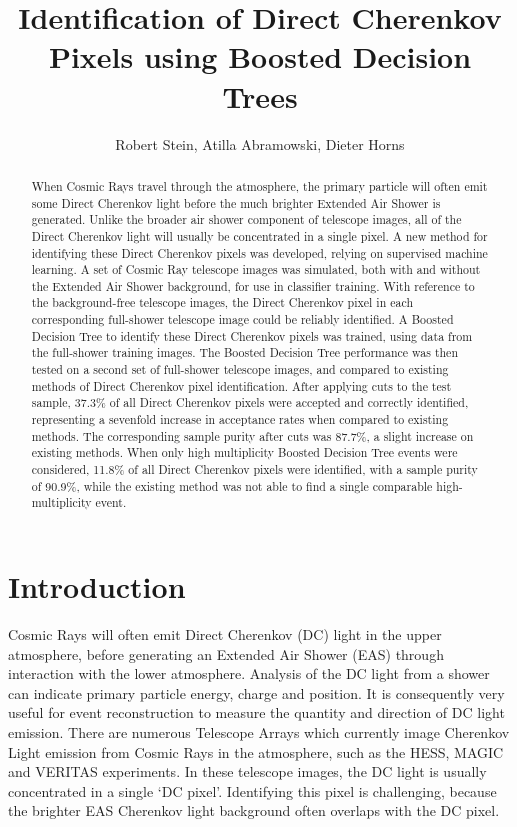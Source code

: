 \documentclass[]{article}
\title{Identification of Direct Cherenkov Pixels using Boosted Decision Trees}
\author{Robert Stein, Atilla Abramowski, Dieter Horns}
\begin{document}
\maketitle

\begin{abstract}
When Cosmic Rays travel through the atmosphere, the primary particle will often emit some Direct Cherenkov light before the much brighter Extended Air Shower is generated. Unlike the broader air shower component of telescope images, all of the Direct Cherenkov light will usually be concentrated in a single pixel. A new method for identifying these Direct Cherenkov pixels was developed, relying on supervised machine learning. A set of Cosmic Ray telescope images was simulated, both with and without the Extended Air Shower background, for use in classifier training. With reference to the background-free telescope images, the Direct Cherenkov pixel in each corresponding full-shower telescope image could be reliably identified. A Boosted Decision Tree to identify these Direct Cherenkov pixels was trained, using data from the full-shower training images. The Boosted Decision Tree performance was then tested on a second set of full-shower telescope images, and compared to existing methods of Direct Cherenkov pixel identification. After applying cuts to the test sample, 37.3\% of all Direct Cherenkov pixels were accepted and correctly identified, representing a sevenfold increase in acceptance rates when compared to existing methods. The corresponding sample purity after cuts was 87.7\%, a slight increase on existing methods. When only high multiplicity Boosted Decision Tree events were considered, 11.8\% of all Direct Cherenkov pixels were identified, with a sample purity of 90.9\%, while the existing method was not able to find a single comparable high-multiplicity event. 
\end{abstract}
\section{Introduction}
Cosmic Rays will often emit Direct Cherenkov (DC) light in the upper atmosphere, before generating an Extended Air Shower (EAS) through interaction with the lower atmosphere. Analysis of the DC light from a shower can indicate primary particle energy, charge and position. It is consequently very useful for event reconstruction to measure the quantity and direction of DC light emission. There are numerous Telescope Arrays which currently image Cherenkov Light emission from Cosmic Rays in the atmosphere, such as the HESS, MAGIC and VERITAS experiments. In these telescope images, the DC light is usually concentrated in a single  \textquoteleft DC pixel'. Identifying this pixel is challenging, because the brighter EAS Cherenkov light background often overlaps with the DC pixel. 
\end{document}
